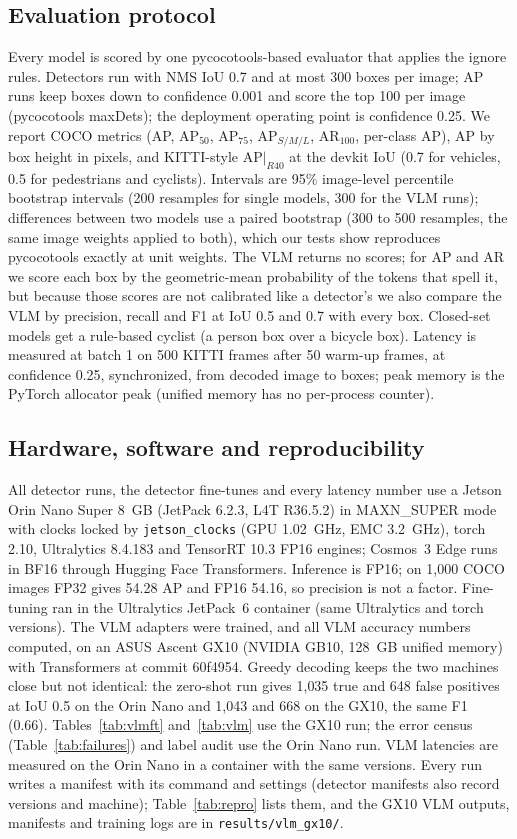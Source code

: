 \documentclass[conference]{IEEEtran}
\begin{document}
\subsection{Evaluation protocol}\label{sec:protocol}
Every model is scored by one pycocotools-based evaluator \cite{cocoapi} that applies the ignore rules. Detectors run
with NMS IoU 0.7 and at most 300 boxes per image; AP runs keep boxes down to confidence 0.001 and score the top 100
per image (pycocotools maxDets); the deployment operating point is confidence 0.25. We report
COCO metrics (AP, AP$_{50}$, AP$_{75}$, AP$_{S/M/L}$, AR$_{100}$, per-class AP), AP by box height in pixels, and
KITTI-style AP$|_{R40}$ at the devkit IoU (0.7 for vehicles, 0.5 for pedestrians and cyclists). Intervals are 95\%
image-level percentile bootstrap intervals \cite{efron1993bootstrap} (200 resamples for single models, 300 for the VLM
runs); differences between two models use a paired bootstrap (300 to 500 resamples, the same image weights applied
to both), which our tests show reproduces pycocotools exactly at unit weights. The VLM returns no scores; for AP and
AR we score each box by the geometric-mean probability of the tokens that spell it, but because those scores are not
calibrated like a detector's we also compare the VLM by precision, recall and F1 at IoU 0.5 and 0.7 with every box.
Closed-set models get a rule-based cyclist (a person box over a bicycle box). Latency is measured at batch 1 on 500
KITTI frames after 50 warm-up frames, at confidence 0.25, synchronized, from decoded image to boxes; peak memory is
the PyTorch allocator peak (unified memory has no per-process counter).

\subsection{Hardware, software and reproducibility}
All detector runs, the detector fine-tunes and every latency number use a Jetson Orin Nano Super 8~GB (JetPack 6.2.3,
L4T R36.5.2) in MAXN\_SUPER mode with clocks locked by
\texttt{jetson\_clocks} (GPU 1.02~GHz, EMC 3.2~GHz), torch 2.10, Ultralytics 8.4.183 \cite{ultralytics} and
TensorRT 10.3 FP16 engines; Cosmos~3 Edge runs in BF16 through Hugging Face Transformers. Inference is FP16; on
1{,}000 COCO images FP32 gives 54.28 AP and FP16 54.16, so precision is not a factor. Fine-tuning ran in the
Ultralytics JetPack~6 container (same Ultralytics and torch versions). The VLM adapters were trained, and all VLM
accuracy numbers computed, on an ASUS Ascent GX10 (NVIDIA GB10, 128~GB unified memory) with Transformers at commit
60f4954. Greedy decoding keeps the two machines close but not identical: the zero-shot run gives 1{,}035 true and
648 false positives at IoU 0.5 on the Orin Nano and 1{,}043 and 668 on the GX10, the same F1 (0.66). Tables~\ref{tab:vlmft} and~\ref{tab:vlm}
use the GX10 run; the error census (Table~\ref{tab:failures}) and label audit use the Orin Nano run. VLM latencies are measured on the Orin Nano in a container with the same versions. Every
run writes a manifest with its command and settings (detector manifests also record versions and machine);
Table~\ref{tab:repro} lists them, and the GX10 VLM outputs, manifests and training logs are in
\texttt{results/vlm\_gx10/}.
\end{document}

